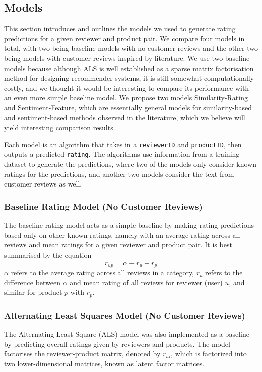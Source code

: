 \documentclass[sigconf,authorversion,nonacm]{acmart}
\begin{document}
\subsection{Models}
This section introduces and outlines the models we used to generate rating predictions for a given reviewer and product pair. We compare four models in total, with two being baseline models with no customer reviews and the other two being models with customer reviews inspired by literature. We use two baseline models because although ALS is well established as a sparse matrix factorisation method for designing recommender systems, it is still somewhat computationally costly, and we thought it would be interesting to compare its performance with an even more simple baseline model. We propose two models Similarity-Rating and Sentiment-Feature, which are essentially general models for similarity-based and sentiment-based methods observed in the literature, which we believe will yield interesting comparison results.

Each model is an algorithm that takes in a \verb|reviewerID| and \verb|productID|, then outputs a predicted \verb|rating|. The algorithms use information from a training dataset to generate the predictions, where two of the models only consider known ratings for the predictions, and another two models consider the text from customer reviews as well. 

\subsubsection{Baseline Rating Model (No Customer Reviews)}
    The baseline rating model acts as a simple baseline by making rating predictions based only on other known ratings, namely with an average rating across all reviews and mean ratings for a given reviewer and product pair. It is best summarised by the equation $$ \hat{r}_{up} = \alpha + \bar{r}_u + \bar{r}_p $$ $\alpha$ refers to the average rating across all reviews in a category, $\bar{r}_u$ refers to the difference between $\alpha$ and mean rating of all reviews for reviewer (user) $u$, and similar for product $p$ with $\bar{r}_p$. \cite{aslanyan2021utilizing} 

\subsubsection{Alternating Least Squares Model (No Customer Reviews)}

    The Alternating Least Square (ALS) model was also implemented as a baseline by predicting overall ratings given by reviewers and products. The model factorises the reviewer-product matrix, denoted by $r_{ui}$, which is factorized into two lower-dimensional matrices, known as latent factor matrices.
\end{document}
